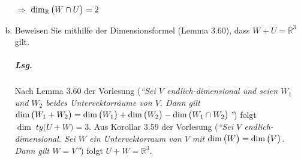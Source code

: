 \documentclass{scrreprt}
\begin{document}
\begin{enumerate}[(a)]
  $\Rightarrow$ \underline{$\dim_{\mathbb{R}}\qty\big(W \cap U) = 2$}

\newpage
\item Beweisen Sie mithilfe der Dimensionsformel (Lemma 3.60), dass
  $W + U = \mathbb{R}^3$ gilt.

  \subparagraph{Lsg.} Nach Lemma 3.60 der Vorlesung (\emph{``Sei $V$
    endlich-dimensional und seien $W_1$ und $W_2$ beides Untervektorräume von
    $V$.
    Dann gilt $\dim\qty\big(W_1 + W_2) = \dim\qty\big(W_1) + \dim\qty\big(W_2)
    - \dim\qty\big(W_1 \cap W_2)$''}) folgt $\dim\;ty\big(U + W) = 3$.
  Aus Korollar 3.59 der Vorlesung (\emph{``Sei $V$ endlich-dimensional.
    Sei $W$ ein Untervektorraum von $V$ mit $\dim\qty\big(W) = \dim\qty\big(V)$.
    Dann gilt $W = V$''}) folgt $U + W = \mathbb{R}^3$.
\end{enumerate}
\end{document}
